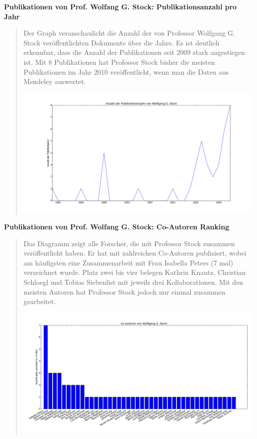 \documentclass[letterpaper,10pt,english]{sphinxmanual}
\begin{document}
\textbf{Publikationen von Prof. Wolfang G. Stock: Publikationsanzahl pro Jahr}
\begin{quote}

Der Graph veranschaulicht die Anzahl der von Professor Wolfgang G. Stock veröffentlichten Dokumente über die Jahre. Es ist deutlich erkennbar, dass die Anzahl der Publikationen seit 2009 stark angestiegen ist. Mit 8 Publikationen hat Professor Stock bisher die meisten Publikationen im Jahr 2010 veröffentlicht, wenn man die Daten aus Mendeley auswertet.

\includegraphics{Stock_publications_timeline.png}
\end{quote}

\textbf{Publikationen von Prof. Wolfang G. Stock: Co-Autoren Ranking}
\begin{quote}

Das Diagramm zeigt alle Forscher, die mit Professor Stock zusammen veröffentlicht haben. Er hat mit zahlreichen Co-Autoren publiziert, wobei am häufigsten eine Zusammenarbeit mit Frau Isabella Peters (7 mal) verzeichnet wurde. Platz zwei bis vier belegen Kathrin Knautz, Christian Schloegl und Tobias Siebenlist mit jeweils drei Kollaborationen. Mit den meisten Autoren hat Professor Stock jedoch nur einmal zusammen gearbeitet.

\includegraphics{Stock_Co-Authors.png}
\end{quote}
\end{document}
